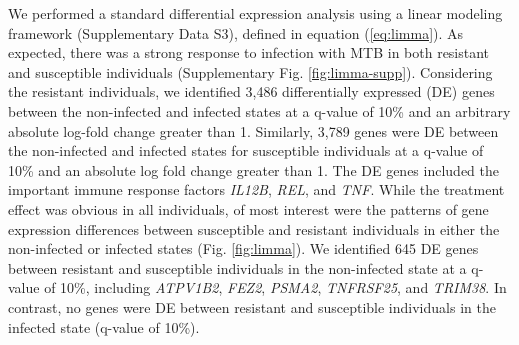 \documentclass[fleqn,10pt]{wlscirep}
\begin{document}
We performed a standard differential expression analysis using a
linear modeling framework (Supplementary Data S3), defined in equation
(\ref{eq:limma}). As expected, there was a strong response to
infection with MTB in both resistant and susceptible individuals
(Supplementary Fig. \ref{fig:limma-supp}). Considering the resistant
individuals, we identified 3,486 differentially expressed (DE) genes
between the non-infected and infected states at a q-value of 10\% and
an arbitrary absolute log-fold change greater than 1. Similarly, 3,789
genes were DE between the non-infected and infected states for
susceptible individuals at a q-value of 10\% and an absolute log fold
change greater than 1. The DE genes included the important immune
response factors \emph{IL12B}, \emph{REL}, and \emph{TNF}. While the
treatment effect was obvious in all individuals, of most interest were
the patterns of gene expression differences between susceptible and
resistant individuals in either the non-infected or infected states
(Fig. \ref{fig:limma}). We identified 645 DE genes between resistant
and susceptible individuals in the non-infected state at a q-value of
10\%, including \emph{ATPV1B2}, \emph{FEZ2}, \emph{PSMA2},
\emph{TNFRSF25}, and \emph{TRIM38}. In contrast, no genes were DE
between resistant and susceptible individuals in the infected state
(q-value of 10\%).
\end{document}
